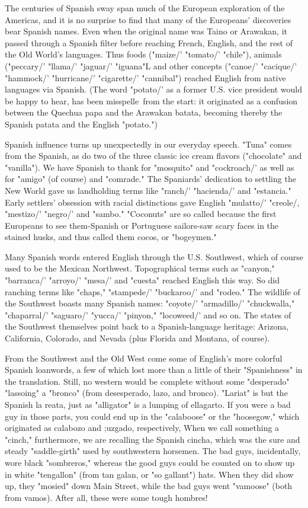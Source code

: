 \documentclass[14pt,a4paper,oneside]{memoir}
\begin{document}
{{{{The centuries of Spanish sway span much of the European
exploration of the Americas, and it is no surprise to find that many of the
Europeans' discoveries bear Spanish names. Even when the original
name was Taino or Arawakan, it passed through a Spanish filter before
reaching French, English, and the rest of the Old World's languages.
Thus foods ("maize/' "tomato/' "chile"), animals ("peccary/' "llama/'
"jaguar/' "iguana"L and other concepts ("canoe/' "cacique/' "hammock/' "hurricane/' "cigarette/' "cannibal") reached English from native languages via Spanish. (The word "potato/' as a former U.S. vice
president would be happy to hear, has been misspelle~from the start:
it originated as a confusion between the Quechua papa and the Arawakan batata, becoming thereby the Spanish patata and the English
"potato.")

Spanish influence turns up unexpectedly in our everyday
speech. "Tuna" comes from the Spanish, as do two of the three classic
ice cream flavors ("chocolate" and "vanilla"). We have Spanish to
thank for "mosquito" and "cockroach/' as well as for "amigo" (of
course) and "comrade." The Spaniards' dedication to settling the New
World gave us landholding terms like "ranch/' "hacienda/' and "estancia." Early settlers' obsession with racial distinctions gave English
"mulatto/' "creole/, "mestizo/' "negro/' and "sambo." "Coconuts" are
so called because the first Europeans to see them-Spanish or Portuguese sailors-saw scary faces in the stained husks, and thus called
them cocos, or "bogeymen."

Many Spanish words entered English through the U.S. Southwest, which of course used to be the Mexican Northwest. Topographical terms such as "canyon," "barranca/' "arroyo/' "mesa/' and "cuesta"
reached English this way. So did ranching terms like "chaps," "stampede/' "buckaroo/' and "rodeo." The wildlife of the Southwest boasts
many Spanish names: "coyote/' "armadillo/' "chuckwalla," "chaparral/' "saguaro/' "yucca/' "pinyon," "locoweed/' and so on. The states
of the Southwest themselves point back to a Spanish-language heritage: Arizona, California, Colorado, and Nevada (plus Florida and Montana, of course).

From the Southwest and the Old West come some of English's
more colorful Spanish loanwords, a few of which lost more than a
little of their "Spanishness" in the translation. Still, no western would
be complete without some "desperado" "lassoing" a "bronco" (from
desesperado, lazo, and bronco). "Lariat" is but the Spanish la reata,
just as "alligator" is a lumping of ellagarto. If you were a bad guy in
those parts, you could end up in the "calaboose" or the "hoosegow,"
which originated as calabozo and ;uzgado, respectively, When we
call something a "cinch," furthermore, we are recalling the Spanish
cincha, which was the sure and steady "saddle-girth" used by southwestern horsemen. The bad guys, incidentally, wore black "sombreros,"
whereas the good guys could be counted on to show up in white "tengallon" (from tan galan, or "so gallant") hats. When they did show up,
they "mosied" down Main Street, while the bad guys went "vamoose"
(both from vamos). After all, these were some tough hombres!

}}}}
\end{document}
